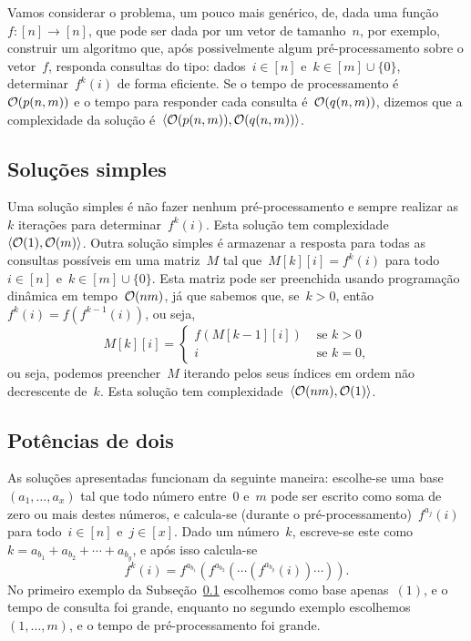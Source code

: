 \documentclass[../../main.tex]{subfiles}
\begin{document}
Vamos considerar o problema, um pouco mais genérico, de, dada uma função~$f : [n] \rightarrow [n]$, que pode ser dada por um vetor de tamanho~$n$, por exemplo, construir um algoritmo que, após possivelmente algum pré-processamento sobre o vetor~$f$, responda consultas do tipo: dados~$i \in [n]$ e~$k \in [m] \cup \{0\}$, determinar~$f^k(i)$ de forma eficiente. Se o tempo de processamento é~$\mathcal{O}(p(n, m))$ e o tempo para responder cada consulta é~$\mathcal{O}(q(n, m))$, dizemos que a complexidade da solução é~$\langle\mathcal{O}(p(n, m)), \mathcal{O}(q(n, m))\rangle$.

\subsection{Soluções simples} \label{subsec:anc_sol_simples}

Uma solução simples é não fazer nenhum pré-processamento e sempre realizar as~$k$ iterações para determinar~$f^k(i)$. Esta solução tem complexidade~$\langle\mathcal{O}(1),\mathcal{O}(m)\rangle$. Outra solução simples é armazenar a resposta para todas as consultas possíveis em uma matriz~$M$ tal que~$M[k][i] = f^k(i)$ para todo~$i \in [n]$ e~$k \in [m] \cup \{0\}$. Esta matriz pode ser preenchida usando programação dinâmica em tempo~$\mathcal{O}(nm)$, já que sabemos que, se~$k > 0$, então~$f^k(i) = f(f^{k-1}(i))$, ou seja,
$$M[k][i] = \left\{
	\begin{array}{ll}
		f(M[k - 1][i]) & \text{ se $k > 0$} \\
		i & \text{ se $k = 0$,}
	\end{array}
	\right.
$$
ou seja, podemos preencher~$M$ iterando pelos seus índices em ordem não decrescente de~$k$. Esta solução tem complexidade~$\langle\mathcal{O}(nm), \mathcal{O}(1)\rangle$.

\subsection{Potências de dois} \label{subsec:pot2}

As soluções apresentadas funcionam da seguinte maneira: escolhe-se uma base~$(a_1, \ldots, a_x)$ tal que todo número entre~0 e~$m$ pode ser escrito como soma de zero ou mais destes números, e calcula-se (durante o pré-processamento)~$f^{a_j}(i)$ para todo~$i \in [n]$ e~$j \in [x]$. Dado um número~$k$, escreve-se este como~$k = a_{b_1} + a_{b_2} + \cdots + a_{b_y}$, e após isso calcula-se
$$f^k(i) = f^{a_{b_1}}(f^{a_{b_2}}(\cdots(f^{a_{b_y}}(i))\cdots)).$$
No primeiro exemplo da Subseção~\ref{subsec:anc_sol_simples} escolhemos como base apenas~$(1)$, e o tempo de consulta foi grande, enquanto no segundo exemplo escolhemos~$(1, \ldots, m)$, e o tempo de pré-processamento foi grande.
\end{document}
